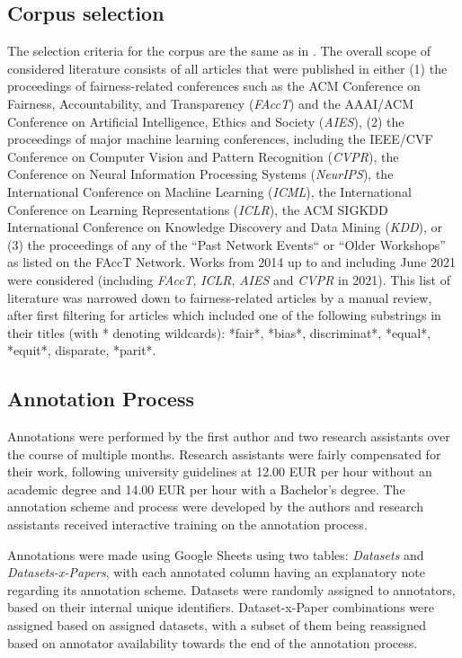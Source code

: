 \subsection{Corpus selection} 
The selection criteria for the corpus are the same as in \citet{fabris2022algorithmic}. The overall scope of considered literature consists of all articles that were published in either (1) the proceedings of fairness-related conferences such as the ACM Conference on Fairness, Accountability, and Transparency (\textit{FAccT}) and the AAAI/ACM Conference on Artificial Intelligence, Ethics and Society (\textit{AIES}), (2) the proceedings of major machine learning conferences, including the IEEE/CVF Conference on Computer Vision and Pattern Recognition (\emph{CVPR}), the Conference on Neural Information Processing Systems (\emph{NeurIPS}), the International Conference on Machine Learning (\emph{ICML}), the International Conference on Learning Representations (\emph{ICLR}), the ACM SIGKDD International Conference on Knowledge Discovery and Data Mining (\emph{KDD}), or (3) the proceedings of any of the ``Past Network Events`` or ``Older Workshops'' as listed on the FAccT Network. Works from 2014 up to and including June 2021 were considered (including \textit{FAccT}, \textit{ICLR}, \textit{AIES} and \textit{CVPR} in 2021). This list of literature was narrowed down to fairness-related articles by a manual review, after first filtering for articles which included one of the following substrings in their titles (with * denoting wildcards): *fair*, *bias*, discriminat*, *equal*, *equit*, disparate, *parit*.

\subsection{Annotation Process}
Annotations were performed by the first author and two research assistants over the course of multiple months. Research assistants were fairly compensated for their work, following university guidelines at 12.00 EUR per hour without an academic degree and 14.00 EUR per hour with a Bachelor's degree. The annotation scheme and process were developed by the authors and research assistants received interactive training on the annotation process.

Annotations were made using Google Sheets using two tables: \textit{Datasets} and \textit{Datasets-x-Papers}, with each annotated column having an explanatory note regarding its annotation scheme. Datasets were randomly assigned to annotators, based on their internal unique identifiers. Dataset-x-Paper combinations were assigned based on assigned datasets, with a subset of them being reassigned based on annotator availability towards the end of the annotation process.

